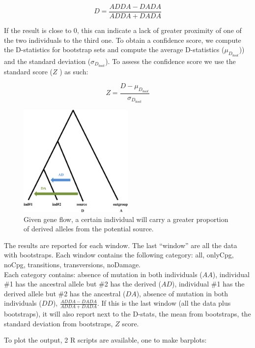 \documentclass[a4paper]{article}
\begin{document}
\[
D= \frac {ADDA-DADA} {ADDA+DADA}
\]


If the result is close to 0, this can indicate a lack of greater proximity of one of the two individuals to the third one. To obtain a confidence score, we compute the D-statistics for bootstrap sets and compute the average D-statistics  ($\mu_{D_{boot}}$)) and the standard deviation ($\sigma_{D_{boot}}$). To assess the confidence score  we use the standard score ($Z$ ) as such:

\[
Z = \frac { D - \mu_{D_{boot}}  } {\sigma_{D_{boot}}}
\]


\begin{figure}[!tpb]%
\centerline{\includegraphics[width=0.5\textwidth,natwidth=510,natheight=542]{dstatnowhite.eps}}
\caption{Given gene flow, a certain individual will carry a greater proportion of derived alleles from the potential source.}
\label{fig:dstat}
\end{figure}

%

The results are reported for each window. The last ``window'' are all the data with bootstraps. Each window contains the following category: all, onlyCpg, noCpg, transitions, transversions, noDamage.\\

Each category contains: absence of mutation in both individuals ($AA$), individual \#1 has the ancestral allele but \#2 has the derived  ($AD$), individual \#1 has the derived allele but \#2 has the ancestral  ($DA$), absence of mutation in both individuals ($DD$),  $\frac {ADDA-DADA} {ADDA+DADA}$. If this is the last window (all the data plus bootstraps), it will also report next to the D-stats, the mean from bootstraps, the standard deviation from bootstraps, $Z$ score.



To plot the output, 2 R scripts are available, one to make barplots:
\end{document}
